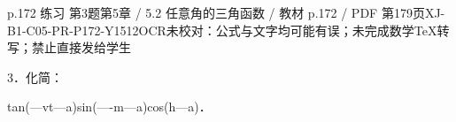 \begin{bankitem}{p.172 练习 第3题}{第5章 / 5.2 任意角的三角函数 / 教材 p.172 / PDF 第179页}{XJ-B1-C05-PR-P172-Y1512}{OCR未校对：公式与文字均可能有误；未完成数学TeX转写；禁止直接发给学生}
\begin{ocrdraft}
\par
3．化简：
\par
tan(—vt—a)sin(—-m—a)cos(h—a)．
\end{ocrdraft}
\end{bankitem}
